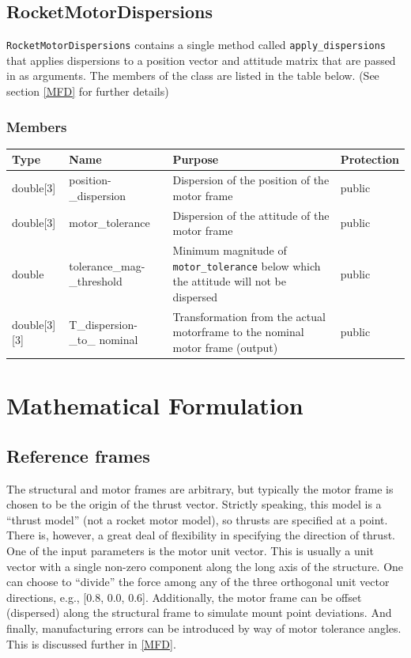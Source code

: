 \documentclass[11pt,fleqn]{report}
\begin{document}
\subsection{RocketMotorDispersions}\label{subsec:RMD}
\par \verb|RocketMotorDispersions| contains a single method called \verb|apply_dispersions| that applies dispersions to a position vector and attitude matrix that are passed in as arguments. The members of the class are listed in the table below. (See section \ref{MFD} for further details)
\subsubsection{Members}
\begin{center}
\begin{tabular}{|p{2.75cm}|p{2.8cm}|p{7.1cm}|l|} \hline
\textbf{Type} & \textbf{Name} & \textbf{Purpose} & \textbf{Protection} \\
\hline
double[3] & position-\newline \_dispersion & Dispersion of the position of the motor frame & public \\
\hline
double[3] & motor\_tolerance & Dispersion of the attitude of the motor frame & public \\
\hline
double & tolerance\_mag-\newline \_threshold & Minimum magnitude of \verb|motor_tolerance| below which the attitude will not be dispersed & public \\
\hline
double[3][3] & T\_dispersion-\newline \_to\_ nominal & Transformation from the actual motor\newline frame to the nominal motor frame (output) & public \\
\hline
\end{tabular}
\end{center}

\section{Mathematical Formulation}
\subsection{Reference frames}
\par 	The structural and motor frames are arbitrary, but typically the motor frame is chosen to be the origin of the thrust vector.  Strictly speaking, this model is a ``thrust model'' (not a rocket motor model), so thrusts are specified at a point.  There is, however, a great deal of flexibility in specifying the direction of thrust.  One of the input parameters is the motor unit vector.  This is usually a unit vector with a single non-zero component along the long axis of the structure.  One can choose to ``divide'' the force among any of the three orthogonal unit vector directions, e.g., [0.8, 0.0, 0.6].  Additionally, the motor frame can be offset (dispersed) along the structural frame to simulate mount point deviations.  And finally, manufacturing errors can be introduced by way of motor tolerance angles.  This is discussed further in \ref{MFD}.
\end{document}
